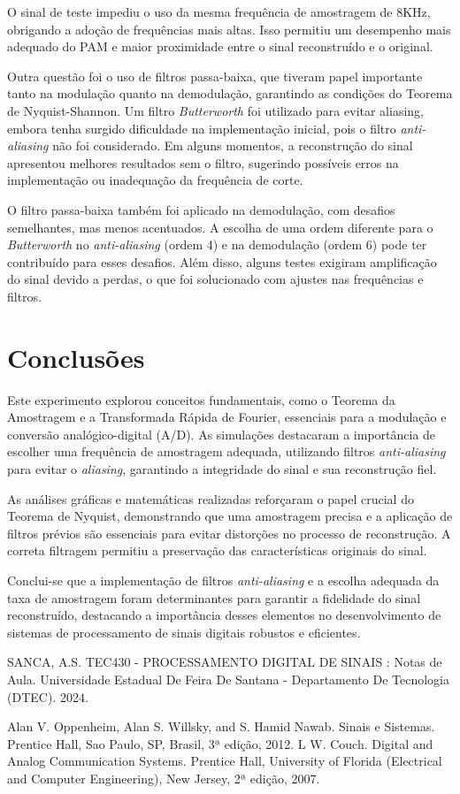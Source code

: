 \documentclass[conference]{IEEEtran}
\begin{document}
O sinal de teste impediu o uso da mesma frequência de amostragem de 8KHz, obrigando a adoção de frequências mais altas. Isso permitiu um desempenho mais adequado do PAM e maior proximidade entre o sinal reconstruído e o original.

Outra questão foi o uso de filtros passa-baixa, que tiveram papel importante tanto na modulação quanto na demodulação, garantindo as condições do Teorema de Nyquist-Shannon. Um filtro \textit{Butterworth} foi utilizado para evitar aliasing, embora tenha surgido dificuldade na implementação inicial, pois o filtro \textit{anti-aliasing} não foi considerado. Em alguns momentos, a reconstrução do sinal apresentou melhores resultados sem o filtro, sugerindo possíveis erros na implementação ou inadequação da frequência de corte.

O filtro passa-baixa também foi aplicado na demodulação, com desafios semelhantes, mas menos acentuados. A escolha de uma ordem diferente para o \textit{Butterworth} no \textit{anti-aliasing} (ordem 4) e na demodulação (ordem 6) pode ter contribuído para esses desafios. Além disso, alguns testes exigiram amplificação do sinal devido a perdas, o que foi solucionado com ajustes nas frequências e filtros.

\section{Conclusões}
Este experimento explorou conceitos fundamentais, como o Teorema da Amostragem e a Transformada Rápida de Fourier, essenciais para a modulação e conversão analógico-digital (A/D). As simulações destacaram a importância de escolher uma frequência de amostragem adequada, utilizando filtros \textit{anti-aliasing} para evitar o \textit{aliasing}, garantindo a integridade do sinal e sua reconstrução fiel.

As análises gráficas e matemáticas realizadas reforçaram o papel crucial do Teorema de Nyquist, demonstrando que uma amostragem precisa e a aplicação de filtros prévios são essenciais para evitar distorções no processo de reconstrução. A correta filtragem permitiu a preservação das características originais do sinal.

Conclui-se que a implementação de filtros \textit{anti-aliasing} e a escolha adequada da taxa de amostragem foram determinantes para garantir a fidelidade do sinal reconstruído, destacando a importância desses elementos no desenvolvimento de sistemas de processamento de sinais digitais robustos e eficientes.

\begin{thebibliography}{00}
 SANCA, A.S. TEC430 - PROCESSAMENTO DIGITAL DE SINAIS : Notas de Aula. Universidade Estadual De Feira De Santana - Departamento De Tecnologia (DTEC). 2024.

 Alan V. Oppenheim, Alan S. Willsky, and S. Hamid Nawab. Sinais e Sistemas. Prentice Hall, Sao Paulo, SP, Brasil, 3ª edição, 2012.
 L W. Couch. Digital and Analog Communication Systems. Prentice Hall, University of Florida (Electrical and Computer Engineering), New Jersey, 2ª edição, 2007.
\end{thebibliography}
\end{document}
